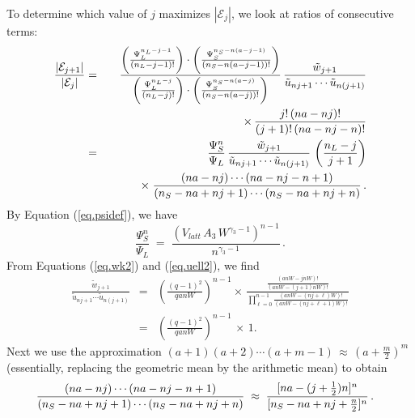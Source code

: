 \documentclass[journal=jacsat,manuscript=article]{achemso}
\begin{document}
To determine which value of $j$ maximizes $|\mathcal{E}_j|$, we look at ratios of consecutive terms:
\begin{eqnarray}
    \frac{|\mathcal{E}_{j+1}|}{|\mathcal{E}_j|}   & = & 
 \frac{
     \left(\frac{\Psi_L^{n_{L}-j-1}}{(n_L-j-1)!}\right)\cdot\left(\frac{\Psi_S^{n_S-n(a-j-1)}}{
    (n_S-n(a-j-1))!}\right) 
      }{
 \left(\frac{\Psi_L^{n_{L}-j}}{(n_L-j)!}\right)\cdot\left(\frac{\Psi_S^{n_S-n(a-j)}}{
    (n_S-n(a-j))!}\right)  }  \,   \frac{\tilde{w}_{j+1} }{  \tilde{u}_{nj+1}\cdots \tilde{u}_{n(j+1)} } 
    \nonumber \\
    & & \hspace{42mm}  
     \times   \, \frac{ j! \, (na-nj)!}{(j+1)!\, (na-nj-n)!}  
    \nonumber    \\
    & = & \frac{\Psi_S^n}{\Psi_L}
    \,   \frac{\tilde{w}_{j+1} }{  \tilde{u}_{nj+1}\cdots \tilde{u}_{n(j+1)} }   \,\left(  \frac{n_L-j}{j+1}\right)
    \nonumber \\
    & &   \hspace{8mm}  \times \;  \frac{(na-nj)\cdots (na-nj-n+1)}{(n_S-na+nj+1)\cdots(n_S-na+nj+n)} \,.
        \label{eq.Yratio1}
\end{eqnarray}
By Equation (\ref{eq.psidef}), we have
\begin{equation}
   \label{eq.psiratio} 
      \frac{\Psi_S^n}{\Psi_L}   \;=\;   \frac{ (V_{latt}\, A_3 \,W^{\gamma_3-1})^{n-1}}{n^{\gamma_3-1}}\,.
\end{equation}
From Equations (\ref{eq.wk2}) and (\ref{eq.uell2}), we find
\begin{eqnarray}
     \frac{\tilde{w}_{j+1} }{  \tilde{u}_{nj+1}\cdots \tilde{u}_{n(j+1)} }  & = & 
        \left( \frac{(q-1)^2}{qanW}\right)^{n-1}   \times \,
    \frac{   \frac{(anW-jnW)!}{(anW-(j+1)nW)!}  }{
        \prod_{\ell=0}^{n-1} \frac{ (anW-(nj+\ell)W)!}{(anW-(nj+\ell+1)W)!}   }
     \nonumber  \\
     & = & \left( \frac{(q-1)^2}{qanW}\right)^{n-1}  \,\times\, 1.
     \label{eq.Yratioa}     
\end{eqnarray}
Next we use the approximation   $(a+1)(a+2)\cdots (a+m-1) \,\approx \,(a+\frac{m}{2})^m$
(essentially, replacing the geometric mean by the arithmetic mean) to obtain
\begin{equation}
       \frac{(na-nj)\cdots (na-nj-n+1)}{(n_S-na+nj+1)\cdots(n_S-na+nj+n)} 
       \; \approx \;    \frac{ [na-(j+\frac{1}{2})n]^n }{ [n_S-na+nj+\frac{n}{2}]^n} \,.\hspace{3mm}
      \label{eq.Yratiob}
\end{equation} 
\end{document}
